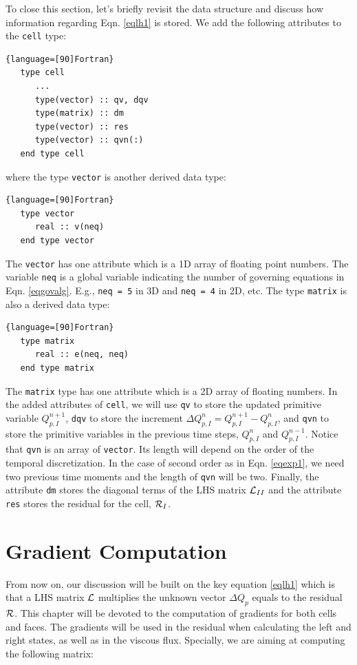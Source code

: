 \documentclass[12pt, letterpaper]{report}
\begin{document}
To close this section, let's briefly revisit the data structure and discuss how information
regarding Eqn. \ref{eqlh1} is stored. We add the following attributes to the \verb+cell+ type:

\begin{lstlisting}{language=[90]Fortran}
   type cell
      ...
      type(vector) :: qv, dqv
      type(matrix) :: dm
      type(vector) :: res
      type(vector) :: qvn(:)
   end type cell
\end{lstlisting}

where the type \verb+vector+ is another derived data type:

\begin{lstlisting}{language=[90]Fortran}
   type vector
      real :: v(neq)
   end type vector
\end{lstlisting}

The \verb+vector+ has one attribute which is a 1D array of floating point numbers. The variable
\verb+neq+ is a global variable indicating the number of governing equations in Eqn.
\ref{eqgovalg}. E.g., \verb+neq = 5+ in 3D and \verb+neq = 4+ in 2D, etc. The type \verb+matrix+ is
also a derived data type:

\begin{lstlisting}{language=[90]Fortran}
   type matrix
      real :: e(neq, neq)
   end type matrix
\end{lstlisting}

The \verb+matrix+ type has one attribute which is a 2D array of floating numbers. In the added
attributes of \verb+cell+, we will use \verb+qv+ to store the updated primitive variable
$Q_{p,I}^{n+1}$, \verb+dqv+ to store the increment $\Delta Q_{p,I}^n = Q_{p,I}^{n+1} -
Q_{p,I}^{n}$, and \verb+qvn+ to store the primitive variables in the previous time steps,
$Q_{p,I}^{n}$ and $Q_{p,I}^{n-1}$. Notice that \verb+qvn+ is an array of \verb+vector+. Its length
will depend on the order of the temporal discretization. In the case of second order as in Eqn.
\ref{eqexp1}, we need two previous time moments and the length of \verb+qvn+ will be two. Finally,
the attribute \verb+dm+ stores the diagonal terms of the LHS matrix $\mathcal{L}_{II}$ and the attribute
\verb+res+ stores the residual for the cell, $\mathcal{R}_I$. \paraspace

\clearpage
\section{Gradient Computation}

From now on, our discussion will be built on the key equation \ref{eqlh1} which is that a LHS
matrix $\mathcal{L}$ multiplies the unknown vector $\Delta Q_p$ equals to the residual $\mathcal{R}$. This chapter
will be devoted to the computation of gradients for both cells and faces. The gradients will be used
in the residual when calculating the left and right states, as well as in the viscous flux.
Specially, we are aiming at computing the following matrix:
\end{document}
